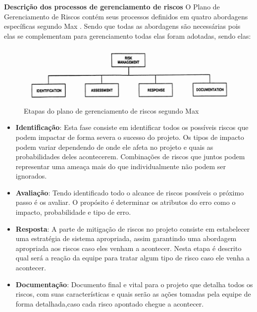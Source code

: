 		\textbf{Descrição dos processos de gerenciamento de riscos}
		O Plano de Gerenciamento de Riscos contém seus processos definidos em quatro abordagens específicas segundo Max \cite{wideman1992project}. Sendo que todas as abordagens são necessárias pois elas se complementam para gerenciamento todas elas foram adotadas, sendo elas:
		
		\graphicspath{{figuras/}}
		\begin{figure}[H]
			\centering
			\includegraphics[scale=0.80]{EAP_Gerenciamento_de_Riscos.png}
			\caption{Etapas do plano de gerenciamento de riscos segundo Max \cite{wideman1992project}}
			\label{img:eap_gerenciamento_de_risco}
		\end{figure}
		
		\begin{itemize}
			\item \textbf{Identificação}: Esta fase consiste em identificar todos os possíveis riscos que podem impactar de forma severa o sucesso do projeto. Os tipos de impacto podem variar dependendo de onde ele afeta no projeto e quais as probabilidades deles acontecerem. Combinações de riscos que juntos podem representar uma ameaça mais do que individualmente não podem ser ignorados.
			\item \textbf{Avaliação}: Tendo identificado todo o alcance de riscos possíveis o próximo passo é os avaliar. O propósito é determinar os atributos do erro como o impacto, probabilidade e tipo de erro.
			\item \textbf{Resposta}: A parte de mitigação de riscos no projeto consiste em estabelecer uma estratégia de sistema apropriada, assim garantindo uma abordagem apropriada aos riscos caso eles venham a acontecer. Nesta etapa é descrito qual será a reação da equipe para tratar algum tipo de risco caso ele venha a acontecer.
			\item \textbf{Documentação}: Documento final e vital para o projeto que detalha todos os riscos, com suas características e quais serão as ações tomadas pela equipe de forma detalhada,caso cada risco apontado chegue a acontecer.
		\end{itemize}
		
